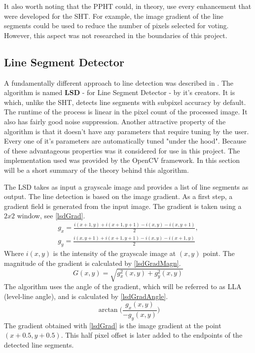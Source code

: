 It also worth noting that the PPHT could, in theory, use every enhancement that were developed for the SHT.
For example, the image gradient of the line segments could be used to reduce the number of pixels selected for voting.
However, this aspect was not researched in the boundaries of this project.

\subsection{Line Segment Detector}

A fundamentally different approach to line detection was described in \cite{LSDDet}.
The algorithm is named \textbf{LSD} - for Line Segment Detector - by it's creators.
It is which, unlike the SHT, detects line segments with subpixel accuracy by default.
The runtime of the process is linear in the pixel count of the processed image.
It also has fairly good noise suppression.
Another attractive property of the algorithm is that it doesn't have any parameters that require tuning by the user.
Every one of it's parameters are automatically tuned "under the hood".
Because of these advantageous properties was it considered for use in this project.
The implementation used was provided by the OpenCV framework.
In this section will be a short summary of the theory behind this algorithm.

The LSD takes as input a grayscale image and provides a list of line segments as output.
The line detection is based on the image gradient.
As a first step, a gradient field is generated from the input image.
The gradient is taken using a $2x2$ window, see \eqref{lsdGrad}.
\begin{equation}
	\begin{split}
		g_x = \frac{i(x+1, y) + i(x+1, y+1) - i(x,y) - i(x, y+1)}{2}, \\
		g_y = \frac{i(x, y+1) + i(x+1, y+1) - i(x,y) - i(x+1, y)}{2}
	\end{split}
	\label{eq:lsdGrad}
\end{equation}
Where $i(x,y)$ is the intensity of the grayscale image at $(x,y)$ point.
The magnitude of the gradient is calculated by \eqref{lsdGradMagn}.
\begin{equation}
	G(x,y) = \sqrt{g_x^2(x,y)+g_y^2(x,y)}
	\label{eq:lsdGradMagn}
\end{equation}
The algorithm uses the angle of the gradient, which will be referred to as LLA (level-line angle), and is calculated by \eqref{lsdGradAngle}.
\begin{equation}
	\arctan\Bigg(\frac{g_x(x,y)}{-g_y(x,y)}\Bigg)
	\label{eq:lsdGradAngle}
\end{equation}
The gradient obtained with \eqref{lsdGrad} is the image gradient at the point $(x+0.5, y+0.5)$.
This half pixel offset is later added to the endpoints of the detected line segments.

